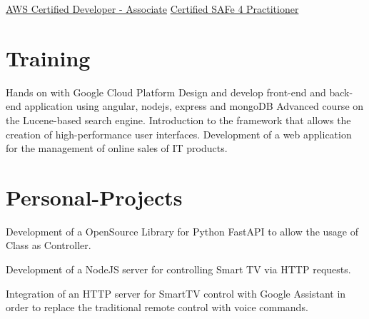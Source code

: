 \documentclass[letterpaper]{twentysecondcv} %
\begin{document}
\begin{twenty} %
	{\href{https://www.certmetrics.com/amazon/public/badge.aspx?i=2&t=c&d=2019-07-11&ci=AWS00935312}{AWS Certified Developer - Associate}}
	{}
	{}
	{\href{https://www.youracclaim.com/badges/8bae5d77-6b02-4bc1-9001-4d7134cd4d9f/linked_i}{Certified SAFe 4 Practitioner}}
	{}
	{}
\end{twenty}


\section{Training}

\begin{twenty} %
	{Hands on with Google Cloud Platform}
	{Design and develop front-end and back-end application using angular, nodejs, express and mongoDB}
	{Advanced course on the Lucene-based search engine.}
	{Introduction to the framework that allows the creation of high-performance user interfaces.}
    {Development of a web application for the management of online sales of IT products.}
\end{twenty}


\section{Personal-Projects}

\item
    {Development of a OpenSource Library for Python FastAPI to allow the usage of Class as Controller.}
\item
    {Development of a NodeJS server for controlling Smart TV via HTTP requests.}
\item
    {Integration of an HTTP server for SmartTV control with Google Assistant in order to replace the traditional remote control with voice commands.}
\end{document}
